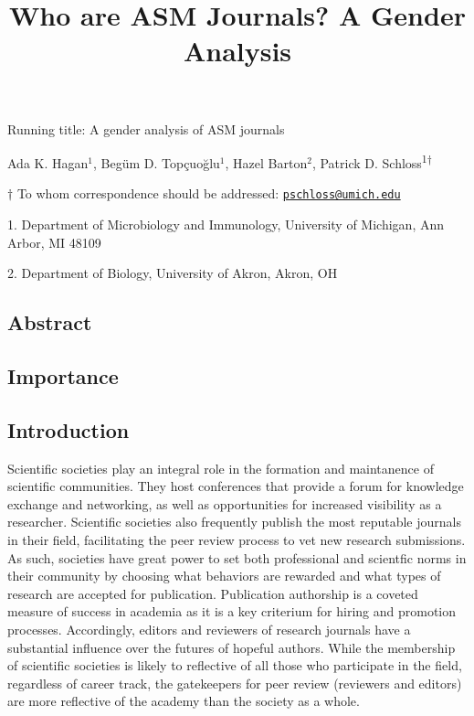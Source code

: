 \documentclass[11pt,]{article}
\title{\textbf{Who are ASM Journals? A Gender Analysis}}
\author{}
\date{}
\begin{document}
\maketitle

\vspace{35mm}

Running title: A gender analysis of ASM journals

\vspace{35mm}

Ada K. Hagan\({^1}\), Begüm D. Topçuoğlu\({^1}\), Hazel Barton\({^2}\),
Patrick D. Schloss\textsuperscript{1\(\dagger\)}

\vspace{40mm}

\(\dagger\) To whom correspondence should be addressed:
\href{mailto:pschloss@umich.edu}{\nolinkurl{pschloss@umich.edu}}

1. Department of Microbiology and Immunology, University of Michigan,
Ann Arbor, MI 48109

2. Department of Biology, University of Akron, Akron, OH

\newpage

\linenumbers

\subsection{Abstract}\label{abstract}

\subsection{Importance}\label{importance}

\subsection{Introduction}\label{introduction}

Scientific societies play an integral role in the formation and
maintanence of scientific communities. They host conferences that
provide a forum for knowledge exchange and networking, as well as
opportunities for increased visibility as a researcher. Scientific
societies also frequently publish the most reputable journals in their
field, facilitating the peer review process to vet new research
submissions. As such, societies have great power to set both
professional and scientfic norms in their community by choosing what
behaviors are rewarded and what types of research are accepted for
publication. Publication authorship is a coveted measure of success in
academia as it is a key criterium for hiring and promotion processes.
Accordingly, editors and reviewers of research journals have a
substantial influence over the futures of hopeful authors. While the
membership of scientific societies is likely to reflective of all those
who participate in the field, regardless of career track, the
gatekeepers for peer review (reviewers and editors) are more reflective
of the academy than the society as a whole.
\end{document}
